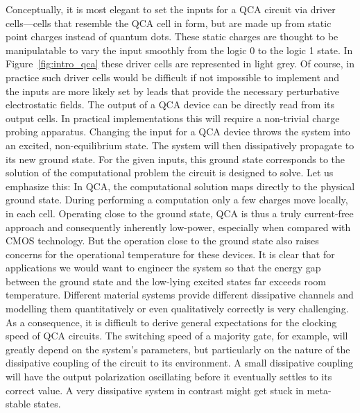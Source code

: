 Conceptually, it is most elegant to set the inputs for a QCA circuit via driver
cells---cells that resemble the QCA cell in form, but are made up from static
point charges instead of quantum dots. These static charges are thought to be
manipulatable to vary the input smoothly from the logic 0 to the logic 1 state.
In Figure~\ref{fig:intro_qca} these driver cells are represented in light grey.
Of course, in practice such driver cells would be difficult if not impossible to
implement and the inputs are more likely set by leads that provide the
necessary perturbative electrostatic fields. The output of a QCA device can be
directly read from its output cells. In practical implementations this will
require a non-trivial charge probing apparatus. Changing the input for a QCA
device throws the system into an excited, non-equilibrium state. The system will
then dissipatively propagate to its new ground state. For the given inputs, this
ground state corresponds to the solution of the computational problem the
circuit is designed to solve. Let us emphasize this: In QCA, the computational
solution maps directly to the physical ground state. During performing a
computation only a few charges move locally, in each cell. Operating close to
the ground state, QCA is thus a truly current-free approach and consequently
inherently low-power, especially when compared with CMOS technology. But the
operation close to the ground state also raises concerns for the operational
temperature for these devices. It is clear that for applications we would want
to engineer the system so that the energy gap between the ground state and the
low-lying excited states far exceeds room temperature.  Different material
systems provide different dissipative channels and modelling them quantitatively
or even qualitatively correctly is very challenging. As a consequence, it is
difficult to derive general expectations for the clocking speed of QCA circuits.
The switching speed of a majority gate, for example, will greatly depend on the
system's parameters, but particularly on the nature of the dissipative coupling
of the circuit to its environment. A small dissipative coupling will have the
output polarization oscillating before it eventually settles to its correct
value. A very dissipative system in contrast might get stuck in meta-stable
states. 

